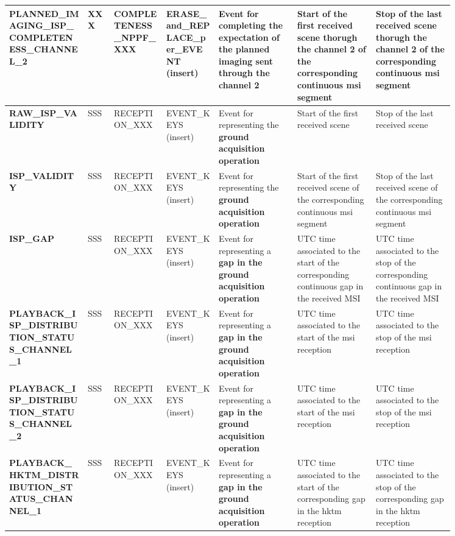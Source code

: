 \begin{landscape}
\begin{longtable}{|M{0.15\linewidth}|M{0.05\linewidth}|M{0.10\linewidth}|M{0.10\linewidth}|M{0.15\linewidth}|M{0.15\linewidth}|M{0.15\linewidth}|}
\textbf{PLANNED\_IMAGING\_ISP\_COMPLETENESS\_CHANNEL\_2} & XXX & \- COMPLETENESS\_NPPF\_XXX & ERASE\_and\_REPLACE\_per\_EVENT (insert) & Event for completing the \textbf{expectation of the planned imaging sent through the channel 2} & Start of the first received scene thorugh the channel 2 of the corresponding continuous \acrshort{msi} segment & Stop of the last received scene thorugh the channel 2 of the corresponding continuous \acrshort{msi} segment \\ \hline
\textbf{RAW\_ISP\_VALIDITY} & SSS & \- RECEPTION\_XXX & EVENT\_KEYS (insert) & Event for representing the \textbf{ground acquisition operation} & Start of the first received scene & Stop of the last received scene \\ \hline
\textbf{ISP\_VALIDITY} & SSS & \- RECEPTION\_XXX & EVENT\_KEYS (insert) & Event for representing the \textbf{ground acquisition operation} & Start of the first received scene of the corresponding continuous \acrshort{msi} segment & Stop of the last received scene of the corresponding continuous \acrshort{msi} segment \\ \hline
\textbf{ISP\_GAP} & SSS & \- RECEPTION\_XXX & EVENT\_KEYS (insert) & Event for representing a \textbf{gap in the ground acquisition operation} & UTC time associated to the start of the corresponding continuous gap in the received MSI & UTC time associated to the stop of the corresponding continuous gap in the received MSI \\ \hline
\textbf{PLAYBACK\_ISP\_DISTRIBUTION\_STATUS\_CHANNEL\_1} & SSS & \- RECEPTION\_XXX & EVENT\_KEYS (insert) & Event for representing a \textbf{gap in the ground acquisition operation} & UTC time associated to the start of the \acrshort{msi} reception & UTC time associated to the stop of the \acrshort{msi} reception \\ \hline
\textbf{PLAYBACK\_ISP\_DISTRIBUTION\_STATUS\_CHANNEL\_2} & SSS & \- RECEPTION\_XXX & EVENT\_KEYS (insert) & Event for representing a \textbf{gap in the ground acquisition operation} & UTC time associated to the start of the \acrshort{msi} reception & UTC time associated to the stop of the \acrshort{msi} reception \\ \hline
\textbf{PLAYBACK\_HKTM\_DISTRIBUTION\_STATUS\_CHANNEL\_1} & SSS & \- RECEPTION\_XXX & EVENT\_KEYS (insert) & Event for representing a \textbf{gap in the ground acquisition operation} & UTC time associated to the start of the corresponding gap in the \acrshort{hktm} reception & UTC time associated to the stop of the corresponding gap in the \acrshort{hktm} reception \\ \hline

\end{longtable}
\end{landscape}
